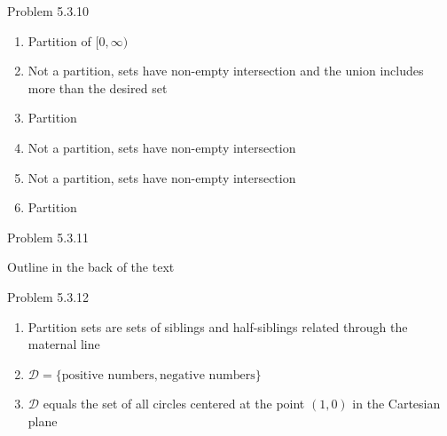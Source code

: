 \documentclass{article}
\theoremstyle{definition}
\begin{document}
	\vspace{1cm}



	\noindent Problem 5.3.10  \vspace{0.3cm}

	\begin{enumerate}
		\item Partition of $[0,\infty)$
		\item Not a partition, sets have non-empty intersection and the union includes more than the desired set
		\item Partition
		\item Not a partition, sets have non-empty intersection
		\item Not a partition, sets have non-empty intersection
		\item Partition
	\end{enumerate}

	\vspace{1cm}



	\noindent Problem 5.3.11  \vspace{0.3cm}

	Outline in the back of the text

	\vspace{1cm}



	\noindent Problem 5.3.12  \vspace{0.3cm}

	\begin{enumerate}
		\item Partition sets are sets of siblings and half-siblings related through the maternal line
		\item $\mathcal{D}=\{\mbox{positive numbers}, \mbox{negative numbers}\}$
		\item $\mathcal{D}$ equals the set of all circles centered at the point $(1,0)$ in the Cartesian plane
	\end{enumerate}


	\vspace{1cm}


\end{document}
